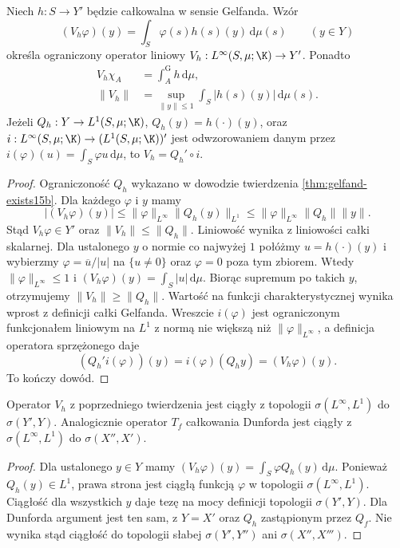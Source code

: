 \begin{twierdzenie}
\label{thm:gelfand-integration-operator15b}
Niech $h:S\to Y'$ będzie całkowalna w sensie Gelfanda.
Wzór
\[
 (V_h\varphi)(y)=\int_S\varphi(s)h(s)(y)\,\mathrm d\mu(s)
 \qquad(y\in Y)
\]
określa ograniczony operator liniowy
$V_h:L^\infty(S,\mu;\K)\to Y'$. Ponadto
\[
 \begin{aligned}
 V_h\chi_A&=\int_A^{\mathrm G}h\,\mathrm d\mu,\\
 \|V_h\|&=\sup_{\|y\|\le1}\int_S|h(s)(y)|\,\mathrm d\mu(s).
 \end{aligned}
\]
Jeżeli $Q_h:Y\to L^1(S,\mu;\K)$,
$Q_h(y)=h(\cdot)(y)$, oraz
$i:L^\infty(S,\mu;\K)\to (L^1(S,\mu;\K))'$ jest
odwzorowaniem danym przez
$i(\varphi)(u)=\int_S\varphi u\,\mathrm d\mu$, to
$V_h=Q_h'\circ i$.
\end{twierdzenie}
\begin{proof}
Ograniczoność $Q_h$ wykazano w dowodzie twierdzenia
\ref{thm:gelfand-exists15b}. Dla każdego $\varphi$
i $y$ mamy
\[
 |(V_h\varphi)(y)|\le
 \|\varphi\|_{L^\infty}\|Q_h(y)\|_{L^1}
 \le\|\varphi\|_{L^\infty}\|Q_h\|\|y\|.
\]
Stąd $V_h\varphi\in Y'$ oraz $\|V_h\|\le\|Q_h\|$.
Liniowość wynika z liniowości całki skalarnej.
Dla ustalonego $y$ o normie co najwyżej $1$ połóżmy
$u=h(\cdot)(y)$ i wybierzmy $\varphi=\overline u/|u|$
na $\{u\ne0\}$ oraz $\varphi=0$ poza tym zbiorem.
Wtedy $\|\varphi\|_{L^\infty}\le1$ i
$(V_h\varphi)(y)=\int_S|u|\,\mathrm d\mu$.
Biorąc supremum po takich $y$, otrzymujemy
$\|V_h\|\ge\|Q_h\|$.
Wartość na funkcji charakterystycznej wynika wprost
z definicji całki Gelfanda.
Wreszcie $i(\varphi)$ jest ograniczonym funkcjonałem
liniowym na $L^1$ z normą nie większą niż
$\|\varphi\|_{L^\infty}$, a definicja operatora sprzężonego
daje
\[
 (Q_h'i(\varphi))(y)=i(\varphi)(Q_hy)=(V_h\varphi)(y).
\]
To kończy dowód.
\end{proof}

\begin{wniosek}
\label{cor:gelfand-weakstar-operator15b}
Operator $V_h$ z poprzedniego twierdzenia jest ciągły
z topologii $\sigma(L^\infty,L^1)$ do $\sigma(Y',Y)$.
Analogicznie operator $T_f$ całkowania Dunforda
jest ciągły z $\sigma(L^\infty,L^1)$ do $\sigma(X'',X')$.
\end{wniosek}
\begin{proof}
Dla ustalonego $y\in Y$ mamy
$(V_h\varphi)(y)=\int_S\varphi Q_h(y)\,\mathrm d\mu$.
Ponieważ $Q_h(y)\in L^1$, prawa strona jest ciągłą
funkcją $\varphi$ w topologii $\sigma(L^\infty,L^1)$.
Ciągłość dla wszystkich $y$ daje tezę na mocy
definicji topologii $\sigma(Y',Y)$.
Dla Dunforda argument jest ten sam, z $Y=X'$
oraz $Q_h$ zastąpionym przez $Q_f$.
Nie wynika stąd ciągłość do topologii słabej
$\sigma(Y',Y'')$ ani $\sigma(X'',X''')$.
\end{proof}

